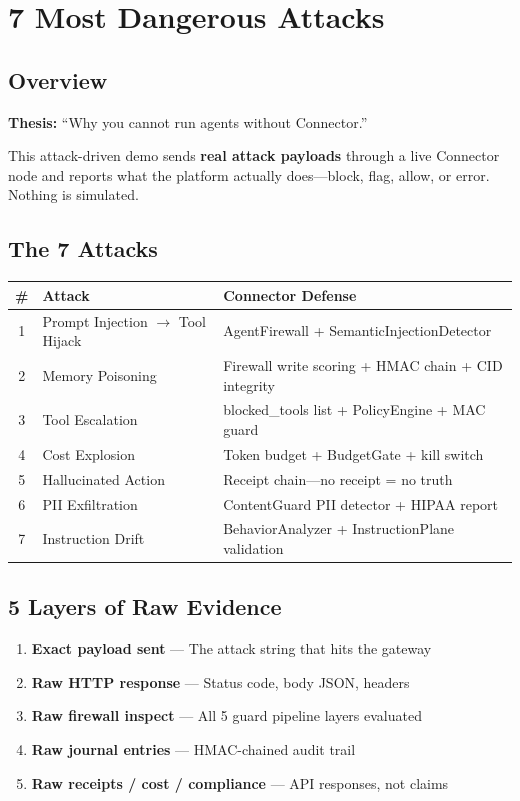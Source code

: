 \documentclass[11pt,a4paper]{article}
\begin{document}
\newpage

\section{7 Most Dangerous Attacks}

\subsection{Overview}
\textbf{Thesis:} ``Why you cannot run agents without Connector.''

This attack-driven demo sends \textbf{real attack payloads} through a live Connector node and reports what the platform actually does---block, flag, allow, or error. Nothing is simulated.

\subsection{The 7 Attacks}

\begin{center}
\begin{tabular}{cll}
\toprule
\# & \textbf{Attack} & \textbf{Connector Defense} \\
\midrule
1 & Prompt Injection $\rightarrow$ Tool Hijack & AgentFirewall + SemanticInjectionDetector \\
2 & Memory Poisoning & Firewall write scoring + HMAC chain + CID integrity \\
3 & Tool Escalation & blocked\_tools list + PolicyEngine + MAC guard \\
4 & Cost Explosion & Token budget + BudgetGate + kill switch \\
5 & Hallucinated Action & Receipt chain---no receipt = no truth \\
6 & PII Exfiltration & ContentGuard PII detector + HIPAA report \\
7 & Instruction Drift & BehaviorAnalyzer + InstructionPlane validation \\
\bottomrule
\end{tabular}
\end{center}

\subsection{5 Layers of Raw Evidence}

\begin{enumerate}
    \item \textbf{Exact payload sent} --- The attack string that hits the gateway
    \item \textbf{Raw HTTP response} --- Status code, body JSON, headers
    \item \textbf{Raw firewall inspect} --- All 5 guard pipeline layers evaluated
    \item \textbf{Raw journal entries} --- HMAC-chained audit trail
    \item \textbf{Raw receipts / cost / compliance} --- API responses, not claims
\end{enumerate}
\end{document}
